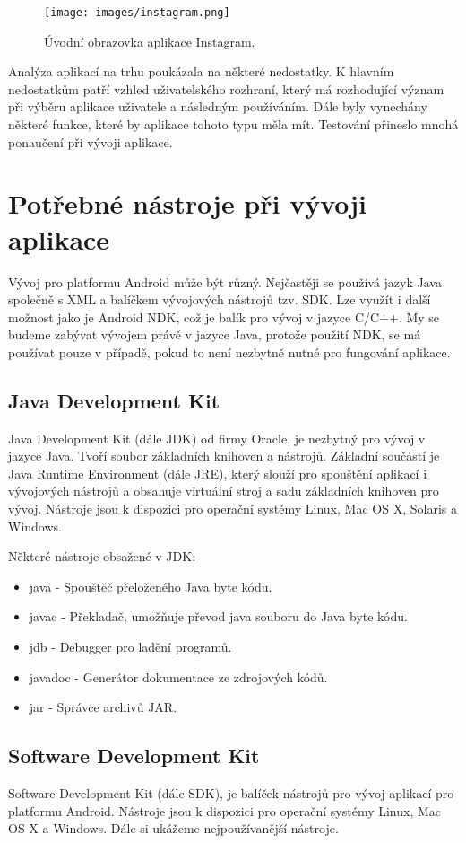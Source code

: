 \documentclass[12pt]{article}
\begin{document}
\begin{figure}[ht]
\centerline{\texttt{[image: images/instagram.png]}}
\caption{Úvodní obrazovka aplikace Instagram.} \label{insta}
\end{figure}
\newpage
Analýza aplikací na trhu poukázala na některé nedostatky. K hlavním nedostatkům patří vzhled uživatelského rozhraní, který má rozhodující význam při výběru aplikace uživatele a následným používáním. Dále byly vynechány některé funkce, které by aplikace tohoto typu měla mít. Testování přineslo mnohá ponaučení při vývoji aplikace.

\newpage
\section{Potřebné nástroje při vývoji aplikace}
Vývoj pro platformu Android může být různý. Nejčastěji se používá jazyk Java společně s XML a balíčkem vývojových nástrojů tzv. SDK. Lze využít i další možnost jako je Android NDK, což je balík pro vývoj v jazyce C/C++. My se budeme zabývat vývojem právě v jazyce Java, protože použití NDK, se má používat pouze v případě, pokud to není nezbytně nutné pro fungování aplikace.
\subsection{Java Development Kit}
Java Development Kit (dále JDK) od firmy Oracle, je nezbytný pro vývoj v jazyce Java. Tvoří soubor základních knihoven a nástrojů. Základní součástí je Java Runtime Environment (dále JRE), který slouží pro spouštění aplikací i vývojových nástrojů a obsahuje virtuální stroj a sadu základních knihoven pro vývoj. Nástroje jsou k dispozici pro operační systémy  Linux, Mac OS X, Solaris a Windows.

Některé nástroje obsažené v JDK:
\begin{itemize}
\item java - Spouštěč přeloženého Java byte kódu.
\item javac - Překladač, umožňuje převod  java souboru do Java byte kódu.
\item jdb - Debugger pro ladění programů.
\item javadoc - Generátor dokumentace ze zdrojových kódů.
\item jar - Správce archivů JAR.
\end{itemize}
\subsection{Software Development Kit}
Software Development Kit (dále SDK), je balíček nástrojů pro vývoj aplikací pro platformu Android. Nástroje jsou k dispozici pro operační systémy  Linux, Mac OS X a Windows. Dále si ukážeme nejpoužívanější nástroje.
\newpage
\end{document}
